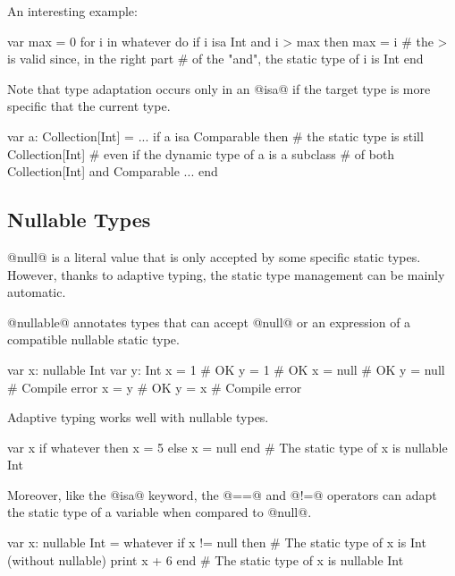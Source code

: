 An interesting example:
\begin{lst}
var max = 0
for i in whatever do
	if i isa Int and i > max then max = i
	# the > is valid since, in the right part
	# of the "and", the static type of i is Int
end
\end{lst}

Note that type adaptation occurs only in an @isa@ if the target type is more specific that the current type.
\begin{lst}
var a: Collection[Int] = ...
if a isa Comparable then
	# the static type is still Collection[Int]
	# even if the dynamic type of a is a subclass
	# of both Collection[Int] and Comparable
	...
end
\end{lst}

\subsection{Nullable Types}\label{null}\label{nullable}\label{or else}\label{not null}

@null@ is a literal value that is only accepted by some specific static types.
However, thanks to adaptive typing, the static type management can be mainly automatic.

@nullable@ annotates types that can accept @null@ or an expression of a compatible nullable static type.

\begin{lst}
var x: nullable Int
var y: Int
x = 1 # OK
y = 1 # OK
x = null # OK
y = null # Compile error
x = y # OK
y = x # Compile error
\end{lst}

Adaptive typing works well with nullable types.

\begin{lst}
var x
if whatever then
	x = 5
else
	x = null
end
# The static type of x is nullable Int
\end{lst}

Moreover, like the @isa@ keyword, the @==@ and @!=@ operators can adapt the static type of a variable when compared to @null@.

\begin{lst}
var x: nullable Int = whatever
if x != null then
	# The static type of x is Int (without nullable)
	print x + 6
end
# The static type of x is nullable Int
\end{lst}

